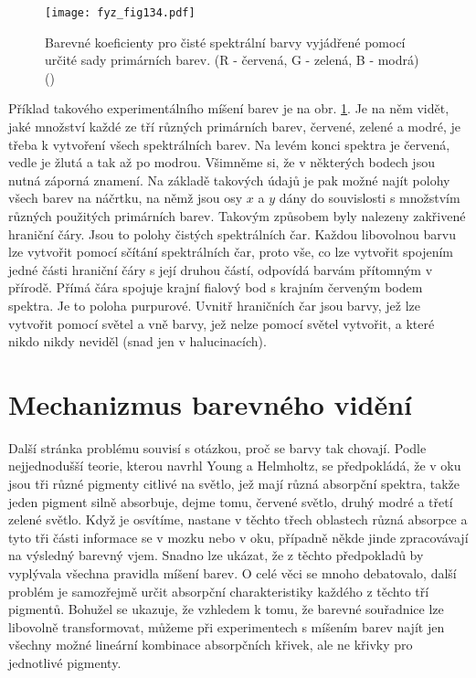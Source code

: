 {    \begin{figure}[ht!]  %
      \centering
      \texttt{[image: fyz\_fig134.pdf]}
      \caption{Barevné koeficienty pro čisté spektrální barvy vyjádřené pomocí určité sady
               primárních barev. (R - červená, G - zelená, B - modrá)
              (\cite[s.~475]{Feynman01})}
      \label{fyz:fig134}
    \end{figure}
    Příklad takového experimentálního míšení barev je na obr. \ref{fyz:fig134}. Je na něm vidět, 
    jaké množství každé ze tří různých primárních barev, červené, zelené a modré, je třeba k 
    vytvoření všech spektrálních barev. Na levém konci spektra je červená, vedle je žlutá a tak až 
    po modrou. Všimněme si, že v některých bodech jsou nutná záporná znamení. Na základě takových 
    údajů je pak možné najít polohy všech barev na náčrtku, na němž jsou osy \(x\) a \(y\) dány do 
    souvislosti s množstvím různých použitých primárních barev. Takovým způsobem byly nalezeny 
    zakřivené hraniční čáry. Jsou to polohy čistých spektrálních čar. Každou libovolnou barvu lze 
    vytvořit pomocí sčítání spektrálních čar, proto vše, co lze vytvořit spojením jedné části 
    hraniční čáry s její druhou částí, odpovídá barvám přítomným v přírodě. Přímá čára spojuje 
    krajní fialový bod s krajním červeným bodem spektra. Je to poloha purpurové. Uvnitř hraničních 
    čar jsou barvy, jež lze vytvořit pomocí světel a vně barvy, jež nelze pomocí světel vytvořit, a 
    které nikdo nikdy neviděl (snad jen v halucinacích).
    
  \section{Mechanizmus barevného vidění}\label{fyz:IchapXXXVsecV}

    Další stránka problému souvisí s otázkou, proč se barvy tak chovají. Podle nejjednodušší 
    teorie, kterou navrhl Young a Helmholtz, se předpokládá, že v oku jsou tři různé pigmenty 
    citlivé na světlo, jež mají různá absorpční spektra, takže jeden pigment silně absorbuje, dejme 
    tomu, červené světlo, druhý modré a třetí zelené světlo. Když je osvítíme, nastane v těchto 
    třech oblastech různá absorpce a tyto tři části informace se v mozku nebo v oku, případně někde 
    jinde zpracovávají na výsledný barevný vjem. Snadno lze ukázat, že z těchto předpokladů by 
    vyplývala všechna pravidla míšení barev. O celé věci se mnoho debatovalo, další problém je 
    samozřejmě určit absorpční charakteristiky každého z těchto tří pigmentů. Bohužel se ukazuje, 
    že vzhledem k tomu, že barevné souřadnice lze libovolně transformovat, můžeme při experimentech 
    s míšením barev najít jen všechny možné lineární kombinace absorpčních křivek, ale ne křivky 
    pro jednotlivé pigmenty. 
    
}
